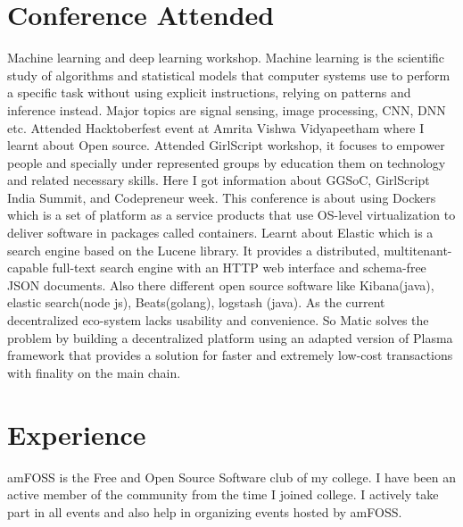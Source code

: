 \documentclass[11pt,a4paper,sans]{moderncv}        %
\begin{document}
\section{Conference Attended}
{Machine learning and deep learning workshop. Machine learning is the scientific study of algorithms and statistical models that computer systems use to perform a specific task without using explicit instructions, relying on patterns and inference instead. Major topics are signal sensing, image processing, CNN, DNN etc.}
{Attended Hacktoberfest event at Amrita Vishwa Vidyapeetham where I learnt about Open source.}
{Attended GirlScript workshop, it focuses to empower people and specially under represented groups by education them on technology and related necessary skills. Here I got information about GGSoC, GirlScript India Summit, and Codepreneur week. }
{This conference is about using Dockers which  is a set of platform as a service products that use OS-level virtualization to deliver software in packages called containers.}
{Learnt about Elastic which is a search engine based on the Lucene library. It provides a distributed, multitenant-capable full-text search engine with an HTTP web interface and schema-free JSON documents. Also there different open source software like Kibana(java), elastic search(node js), Beats(golang), logstash (java).}{}  %
{As the current decentralized eco-system lacks usability and convenience. So Matic solves the problem by building a decentralized platform using an adapted version of Plasma framework that provides a solution for faster and extremely low-cost transactions with finality on the main chain. }  %

\section{Experience}
{amFOSS is the Free and Open Source Software club of my college. I have been an active member of the community from the time I joined college. I actively take part in all events and also help in organizing events hosted by amFOSS.}
\end{document}
